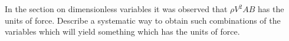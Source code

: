 \begin{enumialphparenastyle}

\begin{ex} In the section on dimensionless variables 
it was observed that $\rho V^{2}AB$ has the units of force. Describe a
systematic way to obtain such combinations of the variables which will yield
something which has the units of force.
\end{ex}

\end{enumialphparenastyle}